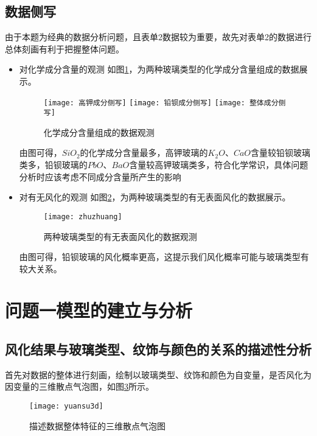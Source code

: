 \documentclass[withoutpreface,bwprint]{cumcmthesis} %
\begin{document}
\subsection{数据侧写}

由于本题为经典的数据分析问题，且表单2数据较为重要，故先对表单2的数据进行总体刻画有利于把握整体问题。

\begin{itemize}
	\item 对化学成分含量的观测 如图\ref{cexie}，为两种玻璃类型的化学成分含量组成的数据展示。
	
	\begin{figure}[!h]
		\centering
		\texttt{[image: 高钾成分侧写]}
		\texttt{[image: 铅钡成分侧写]}
		\texttt{[image: 整体成分侧写]}
		\caption{化学成分含量组成的数据观测}
		\label{cexie}
	\end{figure}


	由图可得，$SiO_{2}$的化学成分含量最多，高钾玻璃的$K_{2}O$、$CaO$含量较铅钡玻璃类多，铅钡玻璃的$PbO$、$BaO$含量较高钾玻璃类多，符合化学常识，具体问题分析时应该考虑不同成分含量所产生的影响
	
	
	\item 对有无风化的观测 如图\ref{zhuzhuang}，为两种玻璃类型的有无表面风化的数据展示。
	
	\begin{figure}[!h]
		\centering
		\texttt{[image: zhuzhuang]}
		\caption{两种玻璃类型的有无表面风化的数据观测}
		\label{zhuzhuang}
	\end{figure}
	
	由图可得，铅钡玻璃的风化概率更高，这提示我们风化概率可能与玻璃类型有较大关系。
	
	
\end{itemize}


\section{问题一模型的建立与分析}
\subsection{风化结果与玻璃类型、纹饰与颜色的关系的描述性分析}
首先对数据的整体进行刻画，绘制以玻璃类型、纹饰和颜色为自变量，是否风化为因变量的三维散点气泡图，如图\ref{yuansu3d}所示。

\begin{figure}[!h]
	\centering
	\texttt{[image: yuansu3d]}
	\caption{描述数据整体特征的三维散点气泡图}
	\label{yuansu3d}
\end{figure}
\end{document}
